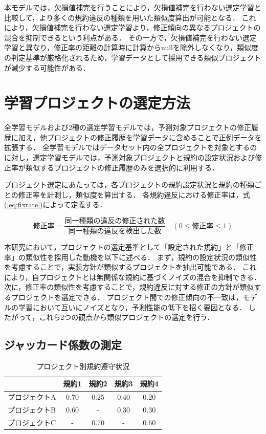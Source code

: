 \documentclass[11pt]{jreport}
\begin{document}
本モデルでは，欠損値補完を行うことにより，欠損値補完を行わない選定学習と比較して，より多くの規約違反の種類を用いた類似度算出が可能となる．
これにより，欠損値補完を行わない選定学習より，修正傾向の異なるプロジェクトの混合を抑制できるという利点がある．
その一方で，欠損値補完を行わない選定学習と異なり，修正率の距離の計算時に計算からnullを除外しなくなり，類似度の判定基準が厳格化されるため，学習データとして採用できる類似プロジェクトが減少する可能性がある．



\section{学習プロジェクトの選定方法}\label{subsec:選定方法}

全学習モデルおよび2種の選定学習モデルでは，予測対象プロジェクトの修正履歴に加え，他プロジェクトの修正履歴を学習データに含めることで正例データを拡張する．
全学習モデルではデータセット内の全プロジェクトを対象とするのに対し，選定学習モデルでは，予測対象プロジェクトと規約の設定状況および修正率が類似するプロジェクトの修正履歴のみを選択的に利用する．

プロジェクト選定にあたっては，各プロジェクトの規約設定状況と規約の種類ごとの修正率を計測し，類似度を算出する．
各規約違反における修正率は，式(\ref{eq:fixrate})によって定義する．

\begin{equation}
\label{eq:fixrate}
\text{修正率} = \frac{\text{同一種類の違反の修正された数}}{\text{同一種類の違反を検出した数}} \quad (0 \le \text{修正率} \le 1)
\end{equation}

本研究において，プロジェクトの選定基準として「設定された規約」と「修正率」の類似性を採用した動機を以下に述べる．
まず，規約の設定状況の類似性を考慮することで，実装方針が類似するプロジェクトを抽出可能である．
これにより，自プロジェクトとは無関係な規約に基づくノイズの混合を抑制できる．
次に，修正率の類似性を考慮することで，規約違反に対する修正の方針が類似するプロジェクトを選定できる．
プロジェクト間での修正傾向の不一致は，モデルの学習において互いにノイズとなり，予測性能の低下を招く要因となる．
したがって，これら2つの観点から類似プロジェクトの選定を行う．



\subsection{ジャッカード係数の測定}

\begin{table}[ht]
    \centering
    \caption{プロジェクト別規約遵守状況}
    \label{tab:example_sim_table}
    \begin{tabular}{lcccc}
        \hline
         & 規約1 & 規約2 & 規約3 & 規約4 \\
        \hline
        プロジェクトA & 0.70 & 0.25 & 0.40 & 0.20 \\
        プロジェクトB & 0.60 & - & 0.30 & 0.30 \\
        プロジェクトC & - & 0.70 & - & 0.60 \\
        \hline
    \end{tabular}
\end{table}
\end{document}
